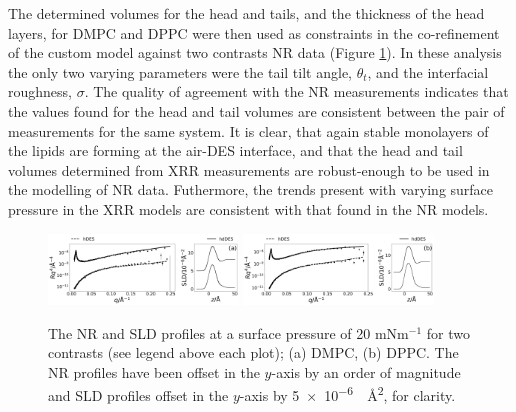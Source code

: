 \documentclass[twocolumn,a4paper]{paper}
\begin{document}
The determined volumes for the head and tails, and the thickness of the head layers, for DMPC and DPPC were then used as constraints in the co-refinement of the custom model against two contrasts NR data (Figure \ref{fig:neutron}). In these analysis the only two varying parameters were the tail tilt angle, $\theta_t$, and the interfacial roughness, $\sigma$.
The quality of agreement with the NR measurements indicates that the values found for the head and tail volumes are consistent between the pair of measurements for the same system.
It is clear, that again stable monolayers of the lipids are forming at the air-DES interface, and that the head and tail volumes determined from XRR measurements are robust-enough to be used in the modelling of NR data.
Futhermore, the trends present with varying surface pressure in the XRR models are consistent with that found in the NR models.
%
\begin{figure}
	\centering
	\includegraphics[width=0.45\textwidth]{figures/dmpc_20n_ref_sld}
	\includegraphics[width=0.45\textwidth]{figures/dppc_20n_ref_sld}
	\caption{\small The NR and SLD profiles at a surface pressure of 20 mNm$^{-1}$ for two contrasts (see legend above each plot); (a) DMPC, (b) DPPC. The NR profiles have been offset in the $y$-axis by an order of magnitude and SLD profiles offset in the $y$-axis by \SI{5e-6}{\per\square\angstrom}, for clarity.}
	\label{fig:neutron}
\end{figure}
%
%
\end{document}
